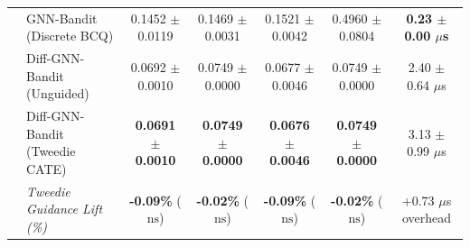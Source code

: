 \documentclass[preprint,12pt,3p]{elsarticle}
\begin{document}
\begin{table}[t]
\begin{tabular*}{\textwidth}{@{\extracolsep{\fill}}llccccc@{}}
\midrule
{} 
& GNN-Bandit (Discrete BCQ) & 0.1452 $\pm$ 0.0119 & 0.1469 $\pm$ 0.0031 & 0.1521 $\pm$ 0.0042 & 0.4960 $\pm$ 0.0804 & \textbf{0.23 $\pm$ 0.00 $\mu$s} \\
& Diff-GNN-Bandit (Unguided) & 0.0692 $\pm$ 0.0010 & 0.0749 $\pm$ 0.0000 & 0.0677 $\pm$ 0.0046 & 0.0749 $\pm$ 0.0000 & 2.40 $\pm$ 0.64 $\mu$s \\
& Diff-GNN-Bandit (Tweedie CATE) & \textbf{0.0691 $\pm$ 0.0010} & \textbf{0.0749 $\pm$ 0.0000} & \textbf{0.0676 $\pm$ 0.0046} & \textbf{0.0749 $\pm$ 0.0000} & 3.13 $\pm$ 0.99 $\mu$s \\
& \textit{Tweedie Guidance Lift (\%)} & \textbf{-0.09\%} ($\text{ns}$) & \textbf{-0.02\%} ($\text{ns}$) & \textbf{-0.09\%} ($\text{ns}$) & \textbf{-0.02\%} ($\text{ns}$) & +0.73 $\mu$s overhead \\
\bottomrule
\end{tabular*}
\end{table}
\end{document}

